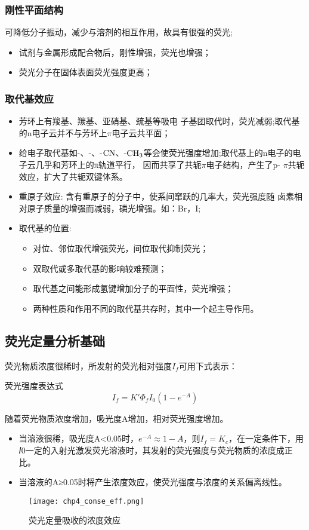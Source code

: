 \subsubsection{刚性平面结构}
可降低分子振动，减少与溶剂的相互作用，故具有很强的荧光;
\begin{itemize}
	\item 试剂与金属形成配合物后，刚性增强，荧光也增强；
	\item 荧光分子在固体表面荧光强度更高；
\end{itemize}
\subsubsection{取代基效应}
\begin{itemize}
	\item 芳环上有羧基、羰基、亚硝基、巯基等吸电 子基团取代时，荧光减弱;取代基的n电子云并不与芳环上$\pi$电子云共平面；
	\item 给电子取代基如-、-、-$\ce{CN}$、-$\ce{CH_{3}}$等会使荧光强度增加;取代基上的n电子的电子云几乎和芳环上的π轨道平行， 因而共享了共轭$\pi$电子结构，产生了p- $\pi$共轭效应，扩大了共轭双键体系。
	\item 重原子效应: 含有重原子的分子中，使系间窜跃的几率大，荧光强度随 卤素相对原子质量的增强而减弱，磷光增强。如：Br，I;
	\item 取代基的位置:
	\begin{itemize}
		\item 对位、邻位取代增强荧光，间位取代抑制荧光；
		\item 双取代或多取代基的影响较难预测；
		\item 取代基之间能形成氢键增加分子的平面性，荧光增强；
		\item 两种性质和作用不同的取代基共存时，其中一个起主导作用。
	\end{itemize}
\end{itemize}

\subsection{荧光定量分析基础}
荧光物质浓度很稀时，所发射的荧光相对强度$I_{f}$可用下式表示：
\begin{theorem*}{荧光强度表达式}
	\begin{equation*}
		I_{f}=K'\Phi_{f}I_{0}(1-e^{-A})
	\end{equation*}
\end{theorem*}
随着荧光物质浓度增加，吸光度A增加，相对荧光强度增加。
\begin{itemize}
	\item 当溶液很稀，吸光度A<0.05时，$e^{-A}\approx 1-A$，则$I_{f}=K_{c}$，在一定条件下，用𝐼0一定的入射光激发荧光溶液时，其发射的荧光强度与荧光物质的浓度成正比。
	\item 当溶液的A≥0.05时将产生浓度效应，使荧光强度与浓度的关系偏离线性。
\end{itemize}
\begin{figure}
	\centering
	\texttt{[image: chp4\_conse\_eff.png]}
	\label{fig:chp4conseeff}
	\caption{荧光定量吸收的浓度效应}
\end{figure}
